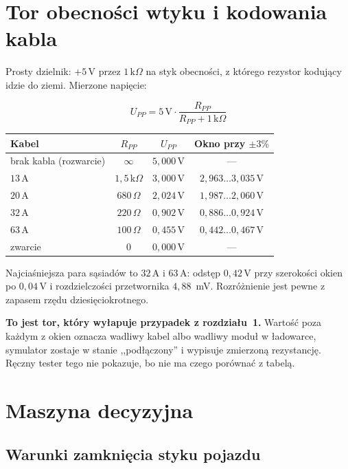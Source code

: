 \documentclass[a4paper,11pt]{article}
\newcommand{\ohm}{\,\Omega}
\newcommand{\kohm}{\,\mathrm{k}\Omega}
\newcommand{\volt}{\,\mathrm{V}}
\newcommand{\amp}{\,\mathrm{A}}
\begin{document}
\section{Tor obecności wtyku i kodowania kabla}
\label{sec:pp}

Prosty dzielnik: $+5\volt$ przez $1\kohm$ na styk obecności, z którego rezystor
kodujący idzie do ziemi. Mierzone napięcie:

\begin{equation}
U_{PP}=5\volt\cdot\frac{R_{PP}}{R_{PP}+1\kohm}
\end{equation}

\begin{center}
\begin{tabular}{lccc}
\toprule
Kabel & $R_{PP}$ & $U_{PP}$ & Okno przy $\pm3\%$ \\
\midrule
brak kabla (rozwarcie) & $\infty$        & $5{,}000\volt$ & --- \\
$13\amp$               & $1{,}5\kohm$    & $3{,}000\volt$ & $2{,}963\ldots3{,}035\volt$ \\
$20\amp$               & $680\ohm$       & $2{,}024\volt$ & $1{,}987\ldots2{,}060\volt$ \\
$32\amp$               & $220\ohm$       & $0{,}902\volt$ & $0{,}886\ldots0{,}924\volt$ \\
$63\amp$               & $100\ohm$       & $0{,}455\volt$ & $0{,}442\ldots0{,}467\volt$ \\
zwarcie                & $0$             & $0{,}000\volt$ & --- \\
\bottomrule
\end{tabular}
\end{center}

Najciaśniejsza para sąsiadów to $32\amp$ i $63\amp$: odstęp $0{,}42\volt$ przy
szerokości okien po $0{,}04\volt$ i rozdzielczości przetwornika $4{,}88$~mV.
Rozróżnienie jest pewne z zapasem rzędu dziesięciokrotnego.

\textbf{To jest tor, który wyłapuje przypadek z rozdziału~1.} Wartość poza każdym
z okien oznacza wadliwy kabel albo wadliwy moduł w ładowarce, symulator zostaje
w stanie ,,podłączony'' i wypisuje zmierzoną rezystancję. Ręczny tester tego nie
pokazuje, bo nie ma czego porównać z tabelą.

\section{Maszyna decyzyjna}
\label{sec:maszyna}

\subsection{Warunki zamknięcia styku pojazdu}
\end{document}
